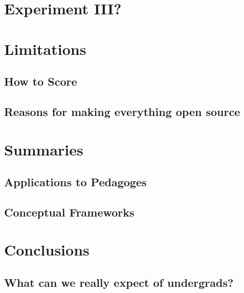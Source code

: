 \documentclass[]{book}
\theoremstyle{definition}
\theoremstyle{definition}
\theoremstyle{definition}
\theoremstyle{remark}
\begin{document}
\hypertarget{experiment-iii}{%
\section{Experiment III?}\label{experiment-iii}}

\hypertarget{limitations-1}{%
\section{Limitations}\label{limitations-1}}

\hypertarget{how-to-score}{%
\subsection{How to Score}\label{how-to-score}}

\hypertarget{reasons-for-making-everything-open-source}{%
\subsection{Reasons for making everything open
source}\label{reasons-for-making-everything-open-source}}

\hypertarget{summaries}{%
\section{Summaries}\label{summaries}}

\hypertarget{applications-to-pedagoges}{%
\subsection{Applications to Pedagoges}\label{applications-to-pedagoges}}

\hypertarget{conceptual-frameworks}{%
\subsection{Conceptual Frameworks}\label{conceptual-frameworks}}

\hypertarget{conclusions}{%
\section{Conclusions}\label{conclusions}}

\hypertarget{what-can-we-really-expect-of-undergrads}{%
\subsection{What can we really expect of
undergrads?}\label{what-can-we-really-expect-of-undergrads}}
\end{document}
